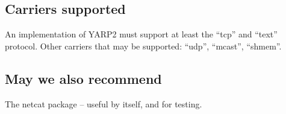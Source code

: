 \documentclass[a4]{article}
\begin{document}






\subsection{Carriers supported}

An implementation of YARP2 must support at least the ``tcp''
and ``text'' protocol.  Other carriers that may be supported:
``udp'', ``mcast'', ``shmem''.


\subsection{May we also recommend}

The netcat package -- useful by itself, and for testing.
\end{document}
